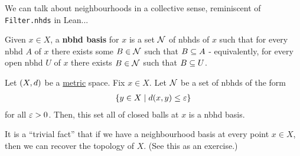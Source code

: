 We can talk about neighbourhoods in a collective sense, reminiscent of \verb|Filter.nhds| in Lean...

\begin{boxdefinition}
    Given $x\in X$, a \textbf{nbhd basis} for $x$ is a set $\mathcal{N}$ of nbhds of $x$ such that for every nbhd $A$ of $x$ there exists some $B \in \mathcal{N}$ such that $B\subseteq A$ - equivalently, for every open nbhd $U$ of $x$ there exists $B\in \mathcal{N}$ such that $B\subseteq U$.
\end{boxdefinition}%


\begin{boxexample}
    Let $\left( X, d \right)$ be a \underline{metric} space. Fix $x \in X$. Let $\mathcal{N}$ be a set of nbhds of the form
    \begin{align*}
        \left\{ y \in X \; \middle\vert \; d\!\left( x, y \right) \leq \varepsilon \right\}
    \end{align*}
    for all $\varepsilon > 0$. Then, this set all of closed balls at $x$ is a nbhd basis. %
\end{boxexample}%
\begin{remark}
    It is a ``trivial fact'' that if we have a neighbourhood basis at every point $x\in X$, then we can recover the topology of $X$. (See this as an exercise.)
\end{remark}